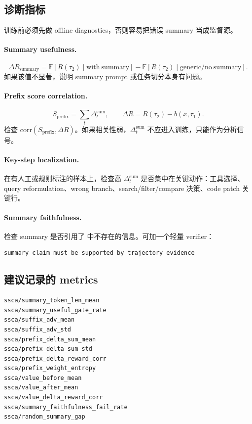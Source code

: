 \documentclass[10pt]{ctexart}
\begin{document}
\subsection{诊断指标}
训练前必须先做 offline diagnostics，否则容易把错误 summary 当成监督源。

\paragraph{Summary usefulness.}
\begin{equation}
  \Delta R_{\mathrm{summary}}
  = \mathbb{E}[R(\tau_2)\mid \mathrm{with\ summary}]
  - \mathbb{E}[R(\tau_2)\mid \mathrm{generic/no\ summary}].
\end{equation}
如果该值不显著，说明 summary prompt 或任务切分本身有问题。

\paragraph{Prefix score correlation.}
\begin{equation}
  S_{\mathrm{prefix}}=\sum_t\Delta_t^{\mathrm{sum}},\qquad
  \Delta R=R(\tau_2)-b(x,\tau_1).
\end{equation}
检查 $\mathrm{corr}(S_{\mathrm{prefix}},\Delta R)$。如果相关性弱，$\Delta_t^{\mathrm{sum}}$ 不应进入训练，只能作为分析信号。

\paragraph{Key-step localization.}
在有人工或规则标注的样本上，检查高 $\Delta_t^{\mathrm{sum}}$ 是否集中在关键动作：工具选择、query reformulation、wrong branch、search/filter/compare 决策、code patch 关键行。

\paragraph{Summary faithfulness.}
检查 summary 是否引用了  中不存在的信息。可加一个轻量 verifier：
\begin{lstlisting}
summary claim must be supported by trajectory evidence
\end{lstlisting}

\subsection{建议记录的 metrics}
\begin{lstlisting}
ssca/summary_token_len_mean
ssca/summary_useful_gate_rate
ssca/suffix_adv_mean
ssca/suffix_adv_std
ssca/prefix_delta_sum_mean
ssca/prefix_delta_sum_std
ssca/prefix_delta_reward_corr
ssca/prefix_weight_entropy
ssca/value_before_mean
ssca/value_after_mean
ssca/value_delta_reward_corr
ssca/summary_faithfulness_fail_rate
ssca/random_summary_gap
\end{lstlisting}
\end{document}
